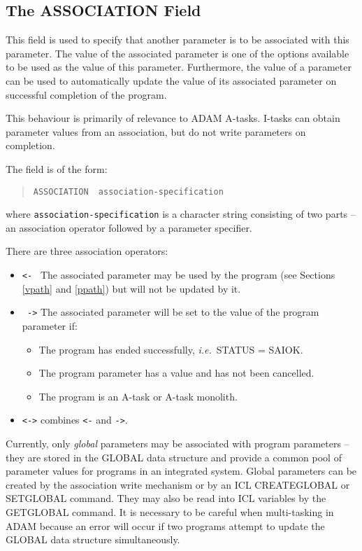 \documentclass[twoside,11pt]{article}
\newcommand{\xlabel}[1]{}
\renewcommand{\_}{\texttt{\symbol{95}}}
\begin{document}
\subsection{The ASSOCIATION Field
\xlabel{the_association_field}\label{association}}

This field is used to specify that another parameter is to be associated
with this parameter.
The value of the associated parameter is one of the options available to be
used as the value of this parameter.
Furthermore, the value of a parameter can be used to automatically update
the value of its associated parameter on successful completion of the
program.

This behaviour is primarily of relevance to ADAM A-tasks. I-tasks 
can obtain parameter values from an association, but do not write 
parameters on completion. 

The field is of the form:
\begin{quote} \begin{verbatim}
ASSOCIATION  association-specification
\end{verbatim} \end{quote}
where \texttt{association-specification} is a character string consisting of two 
parts -- an association operator followed by a parameter specifier.

There are three association operators:
\begin{itemize}
\item \texttt{<- } The associated parameter may be used by the program (see
Sections \ref{vpath} and \ref{ppath}) but will not be updated by it.
\item \texttt{ ->} The associated parameter will be set to the value of the
program parameter if:
\begin{itemize}
\item The program has ended successfully, {\em i.e.}\ STATUS = SAI\_\_OK.
\item The program parameter has a value and has not been cancelled.
\item The program is an A-task or A-task monolith.
\end{itemize}
\item \texttt{<->} combines \texttt{<-} and \texttt{->}.
\end{itemize}

Currently, only {\em global} parameters may be associated with program
parameters  -- they are stored in the GLOBAL data structure and provide a
common pool of parameter values for programs in an integrated system.
Global parameters can be created by the association write
mechanism or by an ICL CREATEGLOBAL or SETGLOBAL command. They may also be
read into ICL variables by the GETGLOBAL command.
It is necessary to be careful when multi-tasking in ADAM because 
an error will occur if two programs attempt to update the GLOBAL data 
structure simultaneously.
\end{document}
